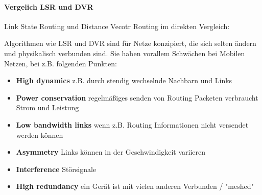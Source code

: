 		\paragraph{Vergelich LSR und DVR}
		Link State Routing und Distance Vecotr Routing im direkten Vergleich:
		\begin{table}[ht]
		\end{table}

		Algorithmen wie LSR und DVR sind für Netze konzipiert, die sich selten ändern und physikalisch verbunden sind. Sie haben vorallem Schwächen bei Mobilen Netzen, bei z.B. folgenden Punkten:

		\begin{itemize}
			\item \textbf{High dynamics} z.B. durch stendig wechselnde Nachbarn und Links
			\item \textbf{Power conservation} regelmäßiges senden von Routing Packeten verbraucht Strom und Leistung
			\item \textbf{Low bandwidth links} wenn z.B. Routing Informationen nicht versendet werden können
			\item \textbf{Asymmetry} Links können in der Geschwindigkeit variieren
			\item \textbf{Interference} Störsignale
			\item \textbf{High redundancy} ein Gerät ist mit vielen anderen Verbunden / "meshed"
		\end{itemize}

